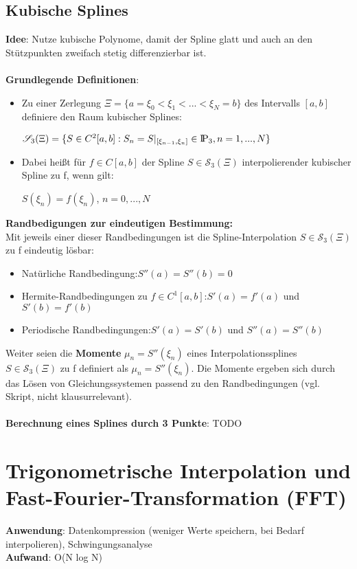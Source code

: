 \documentclass[10pt,a4paper]{article}
\def\polynomials{{\rm I\!P}}
\begin{document}
	\subsection{Kubische Splines}
	\textbf{Idee}: Nutze kubische Polynome, damit der Spline glatt und auch an den Stützpunkten zweifach stetig differenzierbar ist.\\\\
	\textbf{Grundlegende Definitionen}:\\
	\begin{itemize}
		\item Zu einer Zerlegung $\Xi = \{a = \xi_0 < \xi_1 < ... < \xi_N = b\}$ des Intervalls $[a, b]$ definiere den Raum kubischer Splines:
		\begin{center}
			$\mathscr{S}_3(\Xi) = \{S \in C^2[a, b]: S_n = S|_{[\xi_{n-1}, \xi_n]} \in \polynomials_3, n = 1, ..., N\}$
		\end{center}
		\item Dabei heißt für $f \in C[a, b]$ der Spline $S \in \mathscr{S}_3(\Xi)$ interpolierender kubischer Spline zu f, wenn gilt:
		\begin{center}
			$S(\xi_n) = f(\xi_n)$, $n = 0, ..., N$
		\end{center}
	\end{itemize}
	\textbf{Randbedigungen zur eindeutigen Bestimmung:}\\
	Mit jeweils einer dieser Randbedingungen ist die Spline-Interpolation $S \in \mathscr{S}_3(\Xi)$ zu f eindeutig lösbar:
	\begin{itemize}
		\item Natürliche Randbedingung:\hfill$S''(a) = S''(b) = 0$
		\item Hermite-Randbedingungen zu $f \in C^1[a, b]$:\hfill$S'(a) = f'(a)$ und $S'(b) = f'(b)$
		\item Periodische Randbedingungen:\hfill$S'(a) = S'(b)$ und $S''(a) = S''(b)$
	\end{itemize}
	Weiter seien die \textbf{Momente} $\mu_n = S''(\xi_n)$ eines Interpolationssplines $S \in \mathscr{S}_3(\Xi)$ zu f definiert als $\mu_n = S''(\xi_n)$. Die Momente ergeben sich durch das Lösen von Gleichungssystemen passend zu den Randbedingungen (vgl. Skript, nicht klausurrelevant).\\\\
	\textbf{Berechnung eines Splines durch 3 Punkte}: TODO\\
	\newpage
	\section{Trigonometrische Interpolation und Fast-Fourier-Transformation (FFT)}
	\textbf{Anwendung}: Datenkompression (weniger Werte speichern, bei Bedarf interpolieren), Schwingungsanalyse\\
	\textbf{Aufwand}: O(N log N)
	
\end{document}
